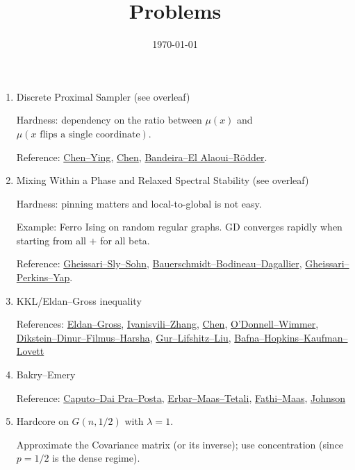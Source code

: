 \documentclass[11pt]{article}
\title{Problems}
\author{}
\date{\today}
\theoremstyle{plain}
\theoremstyle{definition}
\theoremstyle{remark}
\begin{document}
\maketitle



\begin{enumerate}
\item Discrete Proximal Sampler (see overleaf)

Hardness: dependency on the ratio between $\mu(x)$ and $\mu(x \text{ flips a single coordinate})$.

Reference: 
\href{https://arxiv.org/pdf/2402.08095}{Chen--Ying}, \href{https://arxiv.org/pdf/2511.19374}{Chen}, \href{https://arxiv.org/pdf/2607.06813}{Bandeira--El Alaoui--Rödder}.

\item Mixing Within a Phase and Relaxed Spectral Stability (see overleaf)

Hardness: pinning matters and local-to-global is not easy.

Example: Ferro Ising on random regular graphs. 
GD converges rapidly when starting from all $+$ for all beta.

Reference: \href{https://arxiv.org/pdf/2505.15783}{Gheissari--Sly--Sohn}, 
\href{https://arxiv.org/pdf/2310.04609}{Bauerschmidt--Bodineau--Dagallier},
\href{https://arxiv.org/pdf/2511.16620}{Gheissari--Perkins--Yap}.


\item KKL/Eldan--Gross inequality

References: \href{https://arxiv.org/pdf/1909.12067}{Eldan--Gross},
\href{https://arxiv.org/pdf/2407.17864}{Ivanisvili--Zhang},
\href{https://arxiv.org/pdf/2511.19374}{Chen},
\href{https://www.cs.cmu.edu/~odonnell/papers/kkl-kk.pdf}{O'Donnell--Wimmer},
\href{https://arxiv.org/pdf/1804.08155}{Dikstein--Dinur--Filmus--Harsha},
\href{https://arxiv.org/pdf/2111.09375}{Gur--Lifshitz--Liu},
\href{https://arxiv.org/pdf/2111.09444}{Bafna--Hopkins--Kaufman--Lovett}

\item Bakry--Emery

Reference: \href{https://arxiv.org/pdf/0712.2578}{Caputo--Dai Pra--Posta}, \href{https://arxiv.org/pdf/1409.8605}{Erbar--Maas--Tetali}, \href{https://arxiv.org/pdf/1501.00562}{Fathi--Maas}, \href{https://arxiv.org/pdf/1507.06268}{Johnson}


\item Hardcore on $G(n,1/2)$ with $\lambda = 1$. 

Approximate the Covariance matrix (or its inverse); use concentration (since $p = 1/2$ is the dense regime).


\end{enumerate}
\end{document}

